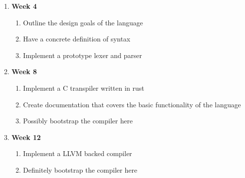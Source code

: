 \documentclass{article}
\begin{document}
\begin{enumerate}
\item
  \textbf{Week 4}

  \begin{enumerate}
  \item
    Outline the design goals of the language
  \item
    Have a concrete definition of syntax
  \item
    Implement a prototype lexer and parser
  \end{enumerate}

\item
  \textbf{Week 8}

  \begin{enumerate}
  \item
    Implement a C transpiler written in rust
  \item
    Create documentation that covers the basic functionality of the language
  \item
    Possibly bootstrap the compiler here
  \end{enumerate}

\item
  \textbf{Week 12}

  \begin{enumerate}
  \item
    Implement a LLVM backed compiler
  \item
    Definitely bootstrap the compiler here
  \end{enumerate}
\end{enumerate}
\end{document}
